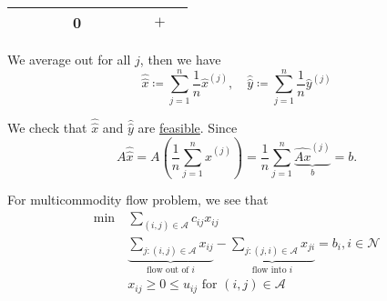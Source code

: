 \begin{explanation}
\begin{table}[H]
\begin{tabular}{c|ccccc|ccccc}
			           &                                           &                                                    &                   & 0            &            &                                                        &            &                                                                                  & \(+\)      &            \\
			\bottomrule
		\end{tabular}
	\end{table}
	\begin{intuition}
		We average out for all \(j\), then we have
		\[
			\hat{\hat{x}} \coloneqq \sum\limits_{j=1}^{n} \frac{1}{n}\hat{x}^{(j)},\quad \hat{\hat{y}} \coloneqq \sum\limits_{j=1}^{n} \frac{1}{n}\hat{y}^{(j)}
		\]
	\end{intuition}

	We check that \(\hat{\hat{x}}\) and \(\hat{\hat{y}}\) are \hyperref[def:feasible-solution]{feasible}. Since
	\[
		A\hat{\hat{x}} = A\left( \frac{1}{n}\sum\limits_{j=1}^{n} \hat{x}^{(j)} \right) = \frac{1}{n}\sum\limits_{j=1}^{n} \underbrace{\hat{Ax}^{(j)}}_{b} = b.
	\]
\end{explanation}

\begin{problem}
For multicommodity flow problem, we see that
\begin{align*}
	\min~ & \sum\limits_{(i, j)\in \mathcal{A}} c_{ij}x_{ij}                                                                                                                                                     \\
	      & \underbrace{\sum\limits_{j\colon (i, j)\in\mathcal{A}} x_{ij}}_{\text{flow out of }i} - \underbrace{\sum\limits_{j\colon (j, i)\in\mathcal{A}} x_{ji}}_{\text{flow into }i}  = b_i, i \in\mathcal{N} \\
	      & x_{ij}\geq 0 \leq u_{ij} \text{ for }(i, j)\in\mathcal{A}
\end{align*}
\end{problem}

